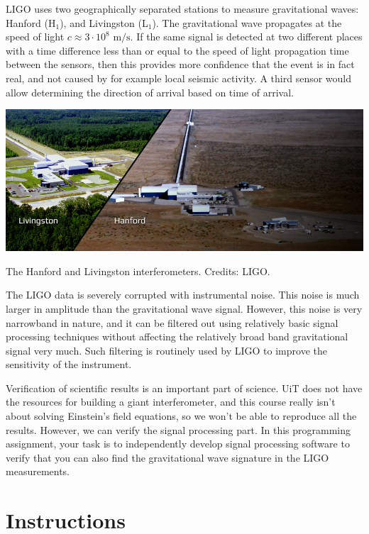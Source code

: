 LIGO uses two geographically separated stations to measure gravitational
waves: Hanford (H$_1$), and Livingston (L$_1$). The gravitational wave
propagates at the speed of light $c\approx 3\cdot 10^8$
$\mathrm{m}/\mathrm{s}$. If the same signal is detected at two
different places with a time difference less than or equal to the
speed of light propagation time between the sensors, then this
provides more confidence that the event is in fact real, and not
caused by for example local seismic activity. A third sensor would
allow determining the direction of arrival based on time of arrival.

\begin{marginfigure}
\begin{center}
\includegraphics[width=\textwidth]{Assignments/figures/hanliv.jpg}
\end{center}
\caption{The Hanford and Livingston interferometers. Credits: LIGO.}
\end{marginfigure}

The LIGO data is severely corrupted with instrumental noise. This
noise is much larger in amplitude than the gravitational wave
signal. However, this noise is very narrowband in nature, and it can
be filtered out using relatively basic signal processing techniques
without affecting the relatively broad band gravitational signal very
much. Such filtering is routinely used by LIGO to improve the
sensitivity of the instrument.

Verification of scientific results is an important part of
science. UiT does not have the resources for building a giant
interferometer, and this course really isn't about solving Einstein's
field equations, so we won't be able to reproduce all the
results. However, we can verify the signal processing part. In this
programming assignment, your task is to independently develop signal
processing software to verify that you can also find the gravitational
wave signature in the LIGO measurements.

\section{Instructions}

